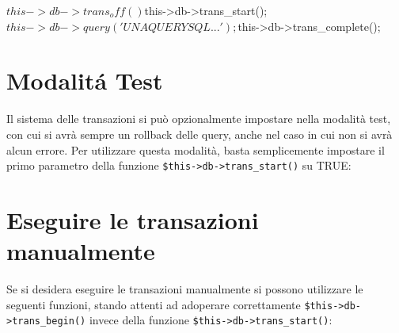 \begin{code}
$this->db->trans_off()

$this->db->trans_start();
$this->db->query('UNA QUERY SQL...');
$this->db->trans_complete();
\end{code}

\section*{Modalit\'a Test}
Il sistema delle transazioni si può opzionalmente impostare nella modalità test, con cui si avrà sempre un rollback delle query, anche nel caso in cui non si avrà alcun errore. Per utilizzare questa modalità, basta semplicemente impostare il primo parametro della funzione \verb|$this->db->trans_start()| su TRUE:


\section*{Eseguire le transazioni manualmente}
Se si desidera eseguire le transazioni manualmente si possono utilizzare le seguenti funzioni, stando attenti ad adoperare correttamente \verb|$this->db->trans_begin()| invece della funzione \verb|$this->db->trans_start()|:

